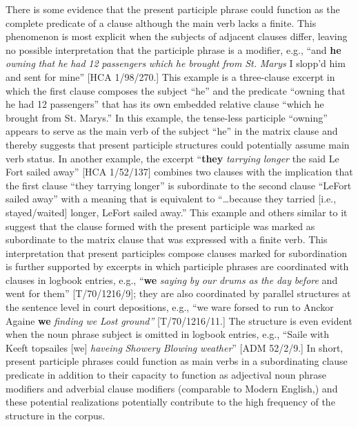   There is some evidence that the present participle phrase could function as the complete predicate of a clause although the main verb lacks a finite. This phenomenon is most explicit when the subjects of adjacent clauses differ, leaving no possible interpretation that the participle phrase is a modifier, e.g., “and \textbf{he} \textit{owning} \textit{that} \textit{he} \textit{had} \textit{12} \textit{passengers} \textit{which} \textit{he} \textit{brought} \textit{from} \textit{St.} \textit{Marys} I slopp’d him and sent for mine” [HCA 1/98/270.] This example is a three-clause excerpt in which the first clause composes the subject “he” and the predicate “owning that he had 12 passengers” that has its own embedded relative clause “which he brought from St. Marys.” In this example, the tense-less participle “owning” appears to serve as the main verb of the subject “he” in the matrix clause and thereby suggests that present participle structures could potentially assume main verb status. In another example, the excerpt “\textbf{they} \textit{tarrying} \textit{longer} the said Le Fort sailed away” [HCA 1/52/137] combines two clauses with the implication that the first clause “they tarrying longer” is subordinate to the second clause “LeFort sailed away” with a meaning that is equivalent to “…because they tarried [i.e., stayed/waited] longer, LeFort sailed away.” This example and others similar to it suggest that the clause formed with the present participle was marked as subordinate to the matrix clause that was expressed with a finite verb. This interpretation that present participles compose clauses marked for subordination is further supported by excerpts in which participle phrases are coordinated with clauses in logbook entries, e.g., “\textbf{we} \textit{saying} \textit{by} \textit{our} \textit{drums} \textit{as} \textit{the} \textit{day} \textit{before} and went for them” [T/70/1216/9]; they are also coordinated by parallel structures at the sentence level in court depositions, e.g., “we ware forsed to run to Anckor Againe \textbf{we} \textit{finding} \textit{we} \textit{Lost} \textit{ground”} [T/70/1216/11.] The structure is even evident when the noun phrase subject is omitted in logbook entries, e.g., “Saile with Keeft topsailes [we] \textit{haveing} \textit{Showery} \textit{Blowing} \textit{weather}” [ADM 52/2/9.] In short, present participle phrases could function as main verbs in a subordinating clause predicate in addition to their capacity to function as adjectival noun phrase modifiers and adverbial clause modifiers (comparable to Modern English,) and these potential realizations potentially contribute to the high frequency of the structure in the corpus. 

